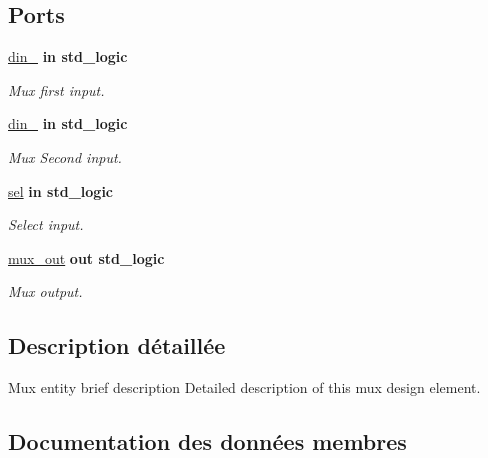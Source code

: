 \subsection*{Ports}
 \begin{DoxyCompactItemize}
\item 
\hyperlink{classmux__using__with_a6b6ddbcf5e151609729ea3dc550a0602}{din\+\_}  {\bfseries {\bfseries \textcolor{vhdlchar}{in}\textcolor{vhdlchar}{ }}} {\bfseries \textcolor{vhdlchar}{std\+\_\+logic}\textcolor{vhdlchar}{ }} 
\begin{DoxyCompactList}\small\item\em Mux first input. \end{DoxyCompactList}\item 
\hyperlink{classmux__using__with_ac132057a1a8271508f59556da8a85fb0}{din\+\_}  {\bfseries {\bfseries \textcolor{vhdlchar}{in}\textcolor{vhdlchar}{ }}} {\bfseries \textcolor{vhdlchar}{std\+\_\+logic}\textcolor{vhdlchar}{ }} 
\begin{DoxyCompactList}\small\item\em Mux Second input. \end{DoxyCompactList}\item 
\hyperlink{classmux__using__with_a00d652a26316e86f236042f42bcc035d}{sel}  {\bfseries {\bfseries \textcolor{vhdlchar}{in}\textcolor{vhdlchar}{ }}} {\bfseries \textcolor{vhdlchar}{std\+\_\+logic}\textcolor{vhdlchar}{ }} 
\begin{DoxyCompactList}\small\item\em Select input. \end{DoxyCompactList}\item 
\hyperlink{classmux__using__with_ab93734a6ea826ed134ddfc695b3a04b4}{mux\+\_\+out}  {\bfseries {\bfseries \textcolor{vhdlchar}{out}\textcolor{vhdlchar}{ }}} {\bfseries \textcolor{vhdlchar}{std\+\_\+logic}\textcolor{vhdlchar}{ }} 
\begin{DoxyCompactList}\small\item\em Mux output. \end{DoxyCompactList}\end{DoxyCompactItemize}


\subsection{Description détaillée}
Mux entity brief description Detailed description of this mux design element. 

\subsection{Documentation des données membres}
\hypertarget{classmux__using__with_a6b6ddbcf5e151609729ea3dc550a0602}{}
